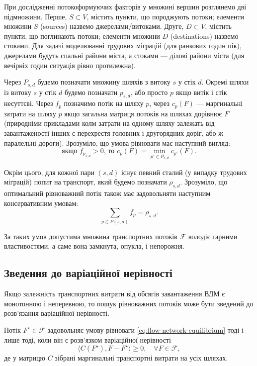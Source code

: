 При дослідженні потокоформуючих факторів у множині вершин розглянемо дві підмножини. Перше, $S \subset V$, містить пункти, що породжують потоки; елементи множини $S$ (sources) назвемо джерелами/витоками. Друге, $D \subset V$, містить пункти, що поглинають потоки; елементи множини $D$ (destinations) назвемо стоками. Для задачі моделюванні трудових міграцій (для ранкових годин пік), джерелами будуть спальні райони міста, а стоками --- ділові райони міста (для вечірніх годин ситуація рівно протилежна). \medskip

Через $P_{s,d}$ будемо позначати множину шляхів з витоку $s$ у стік $d$. Окремі шляхи із витоку $s$ у стік $d$ будемо позначати  $p_{s,d}$, або просто $p$ якщо витік і стік несуттєві. Через $f_p$ позначимо потік на шляху $p$, через $c_p(F)$ --- маргинальні затрати на шляху $p$ якщо загальна матриця потоків на шляхах дорівнює $F$ (природніми прикладами колм затрати на одному шляху залежать від завантаженості інших є перехрестя головних і другорядних доріг, або ж паралельні дороги). Зрозуміло, що умова рівноваги має наступний вигляд:
\begin{equation}
    \label{eq:flow-network-equilibrium}
    \text{якщо } f_{p_{s,d}} > 0 \text{, то } c_p(F) = \min_{p' \in P_{s,d}} c_{p'}(F).
\end{equation}

Окрім цього, для кожної пари $(s,d)$ існує певний сталий (у випадку трудових міграцій) попит на транспорт, який будемо позначати $\rho_{s,d}$. Зрозуміло, що оптимальний рівноважний потік також має задовольняти наступним консервативним умовам:
\begin{equation}
    \sum_{p \in P(s, d)} f_p = \rho_{s, d}.
\end{equation}

\begin{proposition}
    За таких умов допустима множина транспортних потоків $\mathcal{F}$ володіє гарними властивостями, а саме вона замкнута, опукла, і непорожня.
\end{proposition}

\subsection{Зведення до варіаційної нерівності}

Якщо залежність транспортних витрати від обсягів завантаження ВДМ є монотонною і неперевною, то пошук рівноважних потоків може бути зведений до розв'язання варіаційної нерівності.

\begin{theorem}
    Потік $F^\star \in \mathcal{F}$ задовольняє умову рівноваги \eqref{eq:flow-network-equilibrium} тоді і лише тоді, коли він є розв'язком варіаційної нерівності
    \begin{equation}
        \langle C(F^\star), F - F^\star \rangle \ge 0, \quad \forall F \in \mathcal{F},
    \end{equation}
    де у матрицю $C$ зібрані маргинальні транспортні витрати на усіх шляхах.
\end{theorem}

